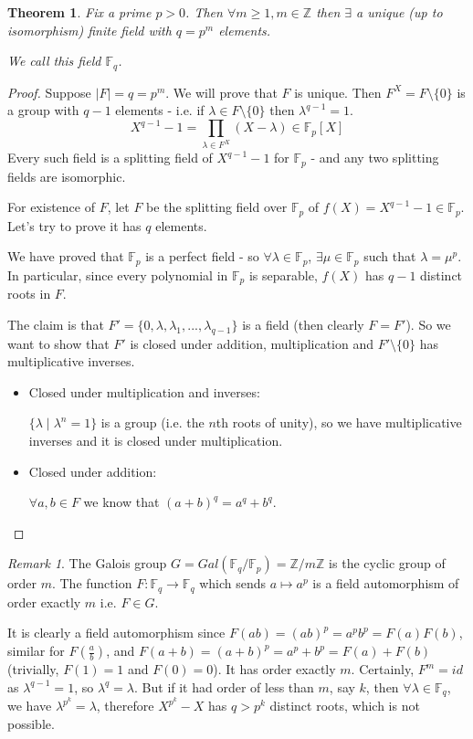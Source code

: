 \documentclass{article}
\theoremstyle{definition}
\theoremstyle{plain}%
\newtheorem{thm}{Theorem}[section]
\theoremstyle{remark}
\newtheorem*{rem}{Remark}
\newcommand{\Z}{\mathbb{Z}}
\newcommand{\F}{\mathbb{F}}
\begin{document}
\begin{thm}
    Fix a prime $p > 0$. Then $\forall m \ge 1, m \in \Z$ then $\exists$ a unique (up to isomorphism) finite field with $q = p^m$ elements.
    
    We call this field $\mathbb{F}_q$.
\end{thm}

\begin{proof}
    Suppose $|F| = q = p^m$. We will prove that $F$ is unique. Then $F^X = F \setminus \{0\}$ is a group with $q-1$ elements - i.e. if $\lambda \in F \setminus \{0\}$ then $\lambda^{q-1} = 1$.
    \[X^{q-1} - 1 = \prod_{\lambda \in F^X}(X - \lambda) \in \mathbb{F}_p[X]\]
    Every such field is a splitting field of $X^{q-1} - 1$ for $\mathbb{F}_p$ - and any two splitting fields are isomorphic.
    
    For existence of $F$, let $F$ be the splitting field over $\F_p$ of $f(X) = X^{q-1} - 1 \in \mathbb{F}_p$. Let's try to prove it has $q$ elements.
    
    We have proved that $\F_p$ is a perfect field - so $\forall \lambda \in \F_p$, $\exists \mu \in \F_p$ such that $\lambda = \mu^p$. In particular, since every polynomial in $\F_p$ is separable, $f(X)$ has $q-1$ distinct roots in $F$.
    
    The claim is that $F' = \{0, \lambda, \lambda_1, ..., \lambda_{q-1}\}$ is a field (then clearly $F= F'$). So we want to show that $F'$ is closed under addition, multiplication and $F' \setminus \{0\}$ has multiplicative inverses.
    \begin{itemize}
        \item Closed under multiplication and inverses:
        
        $\{\lambda \; | \; \lambda^n = 1\}$ is a group (i.e. the $n$th roots of unity), so we have multiplicative inverses and it is closed under multiplication.
        
        \item Closed under addition:
        
        $\forall a,b \in F$ we know that $(a + b)^q = a^q + b^q$. 
    \end{itemize}
\end{proof}

\begin{rem}
    The Galois group $G = Gal(\F_q / \F_p) = \Z / m\Z$ is the cyclic group of order $m$. The function $F : \F_q \to \F_q$ which sends $a \mapsto a^p$ is a field automorphism of order exactly $m$ i.e. $F \in G$.
    
    It is clearly a field automorphism since $F(ab) = (ab)^p = a^pb^p = F(a)F(b)$, similar for $F(\frac{a}{b})$, and $F(a+b) = (a+b)^p = a^p + b^p = F(a) + F(b)$ (trivially, $F(1) = 1$ and $F(0) = 0$). It has order exactly $m$. Certainly, $F^m = id$ as $\lambda^{q-1} = 1$, so $\lambda^q = \lambda$. But if it had order of less than $m$, say $k$, then $\forall \lambda \in \F_q$, we have $\lambda^{p^k} = \lambda$, therefore $X^{p^k} - X$ has $q > p^k$ distinct roots, which is not possible.
\end{rem}
\end{document}
